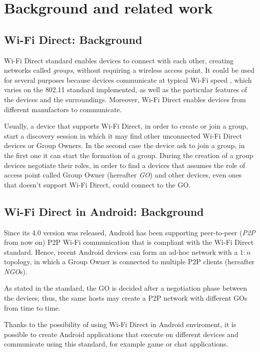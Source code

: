 \section{Background and related work} %
\subsection{Wi-Fi Direct: Background}
Wi-Fi Direct standard enables devices to connect with each other, creating 
networks called \textit{groups}, without requiring a wireless access point. It
could be used for several purposes because devices communicate at typical Wi-Fi
speed \cite{bib:wifiP2pspec}, which varies on the 802.11 standard implemented,
as well as the particular features of the devices and the surroundings.
Moreover, Wi-Fi Direct enables devices from different manufactors to communicate.

Usually, a device that supports Wi-Fi Direct, in order to create or join a group,
start a discovery session in which it may find other unconnected Wi-Fi Direct 
devices or Group Owners. In the second case the device ask to join a group, in the 
first one it can start the formation of a group. During the creation of a group 
devices negotiate their roles, in order to find a devices that assumes the role of 
access point called Group Owner (hereafter \textit{GO}) and other devices, even 
ones that doesn't support Wi-Fi Direct, could connect to the GO. 

\subsection{Wi-Fi Direct in Android: Background}
Since its 4.0 version was released, Android has been supporting peer-to-peer 
(\textit{P2P} from now on) P2P Wi-Fi communication that is compliant with the 
Wi-Fi Direct standard\cite{bib:wifiP2pspec}. 
Hence, recent Android devices can form an ad-hoc network with a $1:n$ topology,
in which a Group Owner is connected to multiple P2P clients (hereafter \textit{NGO}s).

As stated in the standard, the GO is decided after a negotiation phase between
the devices; thus, the same hosts may create a P2P network with different GOs
from time to time.

Thanks to the possibility of using Wi-Fi Direct in Android enviroment, it is 
possible to create Android applications that execute on different devices and 
communicate using this standard, for example game or chat applications. 

